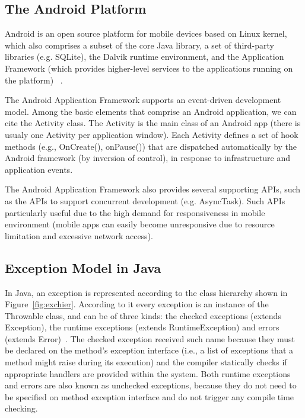 \documentclass[conference]{IEEEtran}
\begin{document}
\subsection{The Android Platform} \label{sec:extypes}
Android is an open source platform for mobile devices based on Linux kernel,
which also comprises a subset of the core Java library, a set of third-party libraries (e.g.  SQLite),
the Dalvik runtime environment, and the Application Framework (which provides 
higher-level services to the applications running on the platform) ~\cite{andguide}.


The Android Application Framework supports an event-driven development model. 
Among the basic elements that comprise an Android application, we can cite the
 Activity class. The Activity is the main class of an Android app (there is usualy one
Activity per application window). Each Activity defines a set of hook methods  
(e.g., OnCreate(), onPause()) that are dispatched automatically by the Android 
framework (by inversion of control), in response to infrastructure and application events.

The Android Application Framework also provides several supporting APIs, such as 
the APIs to support concurrent development (e.g. AsyncTask). 
Such APIs particularly useful due to the high demand for responsiveness 
in mobile environment (mobile apps can easily become 
unresponsive due to resource limitation and excessive network access).



\subsection{Exception Model in Java} \label{sec:extypes}

In Java, an exception is represented according to the class hierarchy shown in
Figure~\ref{fig:exchier}.  According to it every exception is an
instance of the Throwable class, and can be of three kinds: the checked exceptions
(extends Exception), the runtime exceptions (extends RuntimeException) and errors
(extends Error)~\cite{gosling2000java}. The checked exception received such name
 because they must be declared on the method's exception interface (i.e., a list of exceptions that a method 
might raise during its execution) and the compiler statically checks if
 appropriate handlers are provided within the system.
Both runtime exceptions and errors are also known as unchecked exceptions, because 
they do not need to be specified on method exception interface and do not trigger any 
compile time checking.
\end{document}
